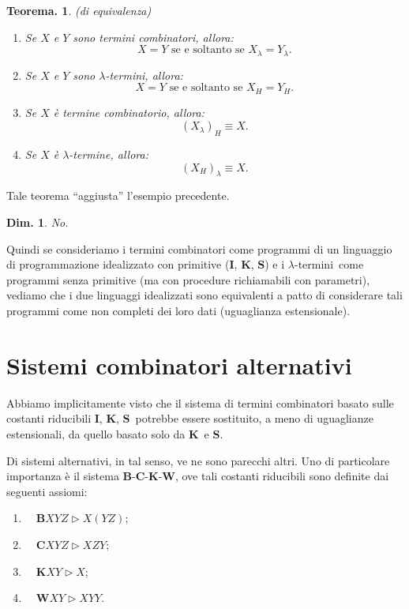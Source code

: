 \documentclass{book}
\newtheorem{teorema}{Teorema.}[chapter]
\newtheorem{dimostrazione}{Dim.}[chapter]
\newcommand*{\II}{$\mathbf{I}$}    %
\newcommand*{\KK}{$\mathbf{K}$}    %
\newcommand*{\SSS}{$\mathbf{S}$}   %
\newcommand*{\CC}{$\mathbf{C}$}    %
\newcommand*{\BB}{$\mathbf{B}$}    %
\newcommand*{\WW}{$\mathbf{W}$}    %
\newcommand*{\kk}{\mathbf{K}}    %
\newcommand*{\cc}{\mathbf{C}}    %
\newcommand*{\bb}{\mathbf{B}}    %
\newcommand*{\ww}{\mathbf{W}}    %
\newcommand*{\lbt}{$\lambda$-ter\-mi\-ne}
\newcommand*{\lbts}{$\lambda$-ter\-mi\-ni}
\begin{document}
\begin{teorema}(di equivalenza)

\begin{enumerate}
\item[-]Se $X$ e $Y$ sono termini combinatori, allora:
\[X = Y\text{ se e soltanto se }
X_\lambda = Y_\lambda.\]
\item[-]Se $X$ e $Y$ sono \lbts, allora:
\[X = Y \text{ se e soltanto se }
X_H = Y_H.\]
\item[-]Se $X$ \`e termine combinatorio, allora: \[(X_\lambda)_H \equiv X.\]
\item[-]Se $X$ \`e \lbt, allora: \[(X_H)_\lambda \equiv X.\]
\end{enumerate}
\end{teorema}
Tale teorema ``aggiusta'' l'esempio precedente.
\begin{dimostrazione}
No.
\end{dimostrazione}

Quindi se consideriamo i termini combinatori come programmi di un linguaggio di
programmazione idealizzato con primitive (\II, \KK, \SSS) e i \lbts~come
programmi senza primitive (ma con procedure richiamabili con parametri), 
vediamo che i due linguaggi idealizzati sono equivalenti a patto di considerare
tali programmi come non completi dei loro dati (uguaglianza estensionale).

\chapter{Sistemi combinatori alternativi}
Abbiamo implicitamente visto che il sistema di termini combinatori basato sulle
costanti riducibili \II, \KK, \SSS~potrebbe essere sostituito, a meno di
uguaglianze estensionali, da quello basato solo da \KK~e \SSS.

Di sistemi alternativi, in tal senso, ve ne sono parecchi altri. Uno di 
particolare importanza \`e il sistema \BB-\CC-\KK-\WW, ove tali costanti
riducibili sono definite dai seguenti assiomi:

\begin{enumerate}
\item[(B)]$\quad\bb XYZ \vartriangleright X(YZ)$;
\item[(C)]$\quad\cc XYZ \vartriangleright XZY$;
\item[(K)]$\quad\kk XY  \vartriangleright X$;
\item[(W)]$\quad\ww XY  \vartriangleright XYY$.
\end{enumerate}
\end{document}
